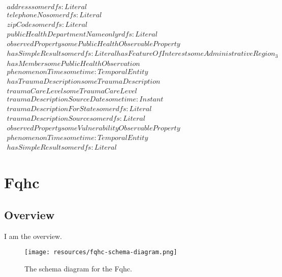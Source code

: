 \begin{align}
  address some rdfs:Literal \\
  telephoneNo some rdfs:Literal \\
  zipCode some rdfs:Literal \\
  publicHealthDepartmentName only rdfs:Literal \\
  observedProperty some PublicHealthObservableProperty \\
  hasSimpleResult some rdfs:Literal   hasFeatureOfInterest some AdministrativeRegion_3 \\
  hasMember some PublicHealthObservation \\
  phenomenonTime some time:TemporalEntity \\
  hasTraumaDescription some TraumaDescription \\
  traumaCareLevel some TraumaCareLevel \\
  traumaDescriptionSourceDate some time:Instant \\
  traumaDescriptionForState some rdfs:Literal \\
  traumaDescriptionSource some rdfs:Literal \\
  observedProperty some VulnerabilityObservableProperty \\
  phenomenonTime some time:TemporalEntity \\
  hasSimpleResult some rdfs:Literal \end{align}



\section{Fqhc}
\label{sec:fqhc}
\subsection{Overview}
\label{ssec:overview}

I am the overview.

\begin{figure}[h!]
  \begin{center}
    \texttt{[image: resources/fqhc-schema-diagram.png]}
  \end{center}
  \caption{The schema diagram for the Fqhc.}
  \label{fig:ov-diagram}
\end{figure}


